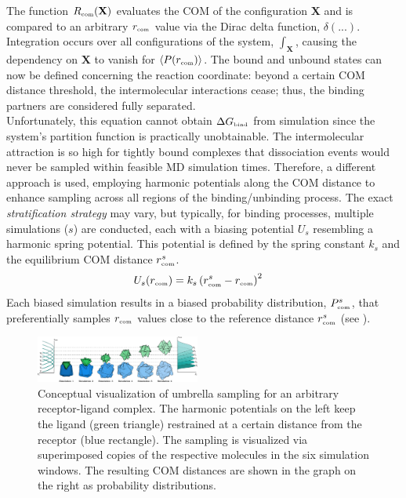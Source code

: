 \documentclass[9pt,tutorial]{livecoms}
\begin{document}
The function $R_\text{\tiny com}(\mathbf{X})$ evaluates the COM of the configuration $\mathbf{X}$ and is compared to an arbitrary $r_\text{\tiny com}$ value via the Dirac delta function, $\delta(...)$. Integration occurs over all configurations of the system, $\int_\mathbf{X}$, causing the dependency on $\mathbf{X}$ to vanish for $\langle P(r_\text{\tiny com}) \rangle$. The bound and unbound states can now be defined concerning the reaction coordinate: beyond a certain COM distance threshold, the intermolecular interactions cease; thus, the binding partners are considered fully separated.\\
Unfortunately, this equation cannot obtain $\Delta G_\text{\tiny bind}$ from simulation since the system's partition function is practically unobtainable. The intermolecular attraction is so high for tightly bound complexes that dissociation events would never be sampled within feasible MD simulation times. Therefore, a different approach is used, employing harmonic potentials along the COM distance to enhance sampling across all regions of the binding/unbinding process. The exact \textit{stratification strategy} may vary, but typically, for binding processes, multiple simulations ($s$) are conducted, each with a biasing potential $U_s$ resembling a harmonic spring potential. This potential is defined by the spring constant $k_s$ and the equilibrium COM distance $r_\text{\tiny com}^s$.
\begin{align}\label{eq:umbrellaBiasingPotential}
    U_s(r_\text{\tiny com}) & = k_s \left( r_\text{\tiny com}^s - r_\text{\tiny com} \right)^2
\end{align}
Each biased simulation results in a biased probability distribution, $P^s_\text{\tiny com}$, that preferentially samples $r_\text{\tiny com}$ values close to the reference distance $r^s_\text{\tiny com}$ (see ).
\begin{figure}
    \centering
    \includegraphics[width=0.48\textwidth]{figures/umbrellaSamplingConcept.png}
    \caption{Conceptual visualization of umbrella sampling for an arbitrary receptor-ligand complex. The harmonic potentials on the left keep the ligand (green triangle) restrained at a certain distance from the receptor (blue rectangle). The sampling is visualized via superimposed copies of the respective molecules in the six simulation windows. The resulting COM distances are shown in the graph on the right as probability distributions.}
    \label{fig:umbrellaSamplingConcept}
\end{figure}
\end{document}
